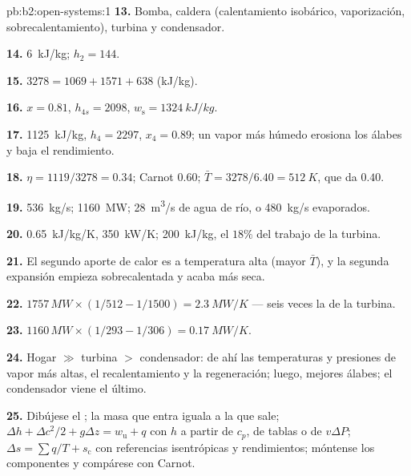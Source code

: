 \begin{solution}{pb:b2:open-systems:1}
\textbf{13.} Bomba, caldera (calentamiento isobárico, vaporización, sobrecalentamiento),
turbina y condensador.

\textbf{14.} \qty{6}{kJ/kg}; $h_2 = 144$.

\textbf{15.} $3278 = 1069 + 1571 + 638$ (\unit{kJ/kg}).

\textbf{16.} $x = 0.81$, $h_{4s} = 2098$, $w_{\text{s}} = \qty{1324}{kJ/kg}$.

\textbf{17.} \qty{1125}{kJ/kg}, $h_4 = 2297$, $x_4 = 0.89$; un vapor más húmedo erosiona los
álabes y baja el rendimiento.

\textbf{18.} $\eta = 1119/3278 = 0.34$; Carnot $0.60$; $\bar T = 3278/6.40 =
\qty{512}{K}$, que da $0.40$.

\textbf{19.} \qty{536}{kg/s}; \qty{1160}{MW}; \qty{28}{m^3/s} de agua de río,
o \qty{480}{kg/s} evaporados.

\textbf{20.} \qty{0.65}{kJ/kg/K}, \qty{350}{kW/K}; \qty{200}{kJ/kg}, el $18\%$ del
trabajo de la turbina.

\textbf{21.} El segundo aporte de calor es a temperatura alta (mayor
$\bar T$), y la segunda expansión empieza sobrecalentada y acaba más seca.

\textbf{22.} $1757\,\unit{MW} \times (1/512 - 1/1500) = \qty{2.3}{MW/K}$ --- seis veces
la de la turbina.

\textbf{23.} $1160\,\unit{MW} \times (1/293 - 1/306) = \qty{0.17}{MW/K}$.

\textbf{24.} Hogar $\gg$ turbina $>$ condensador: de ahí las temperaturas y presiones
de vapor más altas, el recalentamiento y la regeneración; luego, mejores
álabes; el condensador viene el último.

\textbf{25.} Dibújese el ; la masa que entra iguala a la que sale; $\Delta h +
\Delta c^2/2 + g\Delta z = w_{\text{u}} + q$ con $h$ a partir de $c_p$, de tablas o de
$v\Delta P$; $\Delta s = \sum q/T + s_{\text{c}}$ con referencias isentrópicas y
rendimientos; móntense los componentes y compárese con Carnot.
\end{solution}
